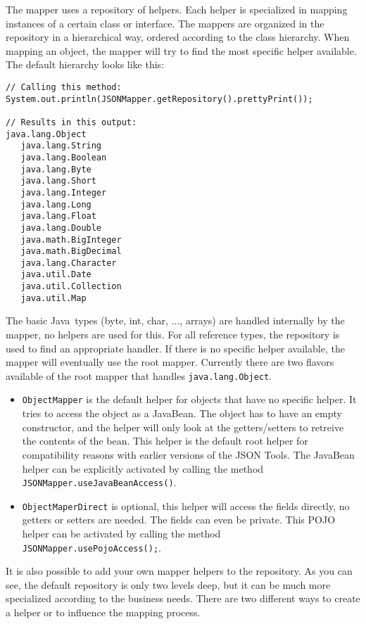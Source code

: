 \documentclass[a4paper]{article}
\newcommand{\jtools}{JSON Tools}
\newcommand{\java}{Java}
\begin{document}
The mapper uses a repository of helpers. Each helper is specialized in mapping instances of a certain class or interface. The mappers are organized in the repository in a hierarchical way, ordered according to the class hierarchy. When mapping an object, the mapper will try to find the most specific helper available. The default hierarchy looks like this:

\begin{lstlisting}
// Calling this method:
System.out.println(JSONMapper.getRepository().prettyPrint());

// Results in this output:
java.lang.Object
   java.lang.String
   java.lang.Boolean
   java.lang.Byte
   java.lang.Short
   java.lang.Integer
   java.lang.Long
   java.lang.Float
   java.lang.Double
   java.math.BigInteger
   java.math.BigDecimal
   java.lang.Character
   java.util.Date
   java.util.Collection
   java.util.Map
\end{lstlisting}

The basic \java\ types (byte, int, char, ..., arrays) are handled internally by the mapper, no helpers are used for this. For all reference types, the repository is used to find an appropriate handler. If there is no specific helper available, the mapper will eventually use the root mapper. Currently there are two flavors available of the root mapper that handles \lstinline{java.lang.Object}.

\begin{itemize}
   \item \lstinline{ObjectMapper} is the default helper for objects that have no specific helper. It tries to access the object as a JavaBean. The object has to have an empty constructor, and the helper will only look at the getters/setters to retreive the contents of the bean. This helper is the default root helper for compatibility reasons with earlier versions of the \jtools. The JavaBean helper can be explicitly activated by calling the method \lstinline{JSONMapper.useJavaBeanAccess()}.
   \item \lstinline{ObjectMaperDirect} is optional, this helper will access the fields directly, no getters or setters are needed. The fields can even be private. This POJO helper can be activated by calling the method \lstinline{JSONMapper.usePojoAccess();}.
\end{itemize}

It is also possible to add your own mapper helpers to the repository. As you can see, the default repository is only two levels deep, but it can be much more specialized according to the business needs. There are two different ways to create a helper or to influence the mapping process.
\end{document}
